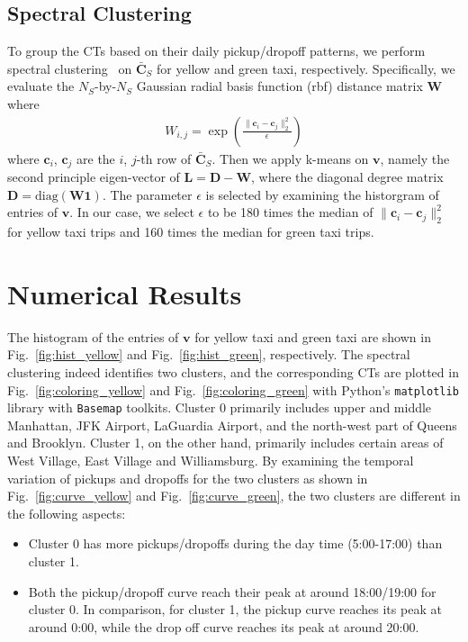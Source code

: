 \documentclass[journal]{IEEEtran}
\begin{document}
\subsection{Spectral Clustering}
To group the CTs based on their daily pickup/dropoff patterns, we perform
spectral clustering~\cite{von2007tutorial} on $\bar{\mathbf{C}}_S$ for yellow
and green taxi, respectively. Specifically, we evaluate the $N_S$-by-$N_S$ Gaussian radial
basis function (rbf) distance matrix $\mathbf{W}$ where
\begin{align}
  W_{i,j} = \exp\left(\frac{\|\mathbf{c}_i -
  \mathbf{c}_j\|_2^2}{\epsilon}\right)
\end{align}
where $\mathbf{c}_i$, $\mathbf{c}_j$ are the $i$, $j$-th row of
$\bar{\mathbf{C}}_S$. Then we apply k-means on $\mathbf{v}$, namely the second
principle eigen-vector of $\mathbf{L} = \mathbf{D} - \mathbf{W}$, where the
diagonal degree matrix $\mathbf{D} = \mbox{diag}(\mathbf{W1})$. The parameter
$\epsilon$ is selected by examining the historgram of entries of $\mathbf{v}$.
In our case, we select $\epsilon$ to be 180 times the median of $\|\mathbf{c}_i
- \mathbf{c}_j\|_2^2$ for yellow taxi trips and 160 times the median for green
taxi trips.

\section{Numerical Results}
\label{sec:numerical}
The histogram of the entries of $\mathbf{v}$ for yellow taxi and green taxi are
shown in Fig.~\ref{fig:hist_yellow} and Fig.~\ref{fig:hist_green},
respectively. The spectral clustering indeed identifies two clusters, and the
corresponding CTs are plotted in Fig.~\ref{fig:coloring_yellow} and
Fig.~\ref{fig:coloring_green} with Python's \texttt{matplotlib} library with
\texttt{Basemap} toolkits. Cluster 0 primarily includes upper and middle
Manhattan, JFK Airport, LaGuardia Airport, and the north-west part of Queens
and Brooklyn. Cluster 1, on the other hand, primarily includes certain areas
of West Village, East Village and Williamsburg. By examining the temporal
variation of pickups and dropoffs for the two clusters as shown in
Fig.~\ref{fig:curve_yellow} and Fig.~\ref{fig:curve_green}, the two clusters are
different in the following aspects:
\begin{itemize}
  \item Cluster 0 has more pickups/dropoffs during the day time (5:00-17:00)
  than cluster 1.
  \item Both the pickup/dropoff curve reach their peak at around 18:00/19:00 for
  cluster 0. In comparison, for cluster 1, the pickup curve reaches its peak at
  around 0:00, while the drop off curve reaches its peak at around 20:00.
\end{itemize}
\end{document}

